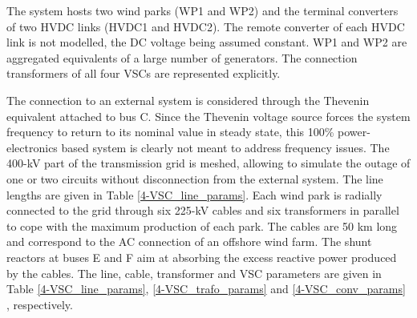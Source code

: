 \documentclass{report}
\begin{document}
The system hosts two wind parks (WP1 and WP2) and the terminal converters of two HVDC links (HVDC1 and HVDC2). The remote converter of each HVDC link is not modelled, the DC voltage being assumed constant. WP1 and WP2 are aggregated equivalents of a large number of generators. The connection transformers of all four VSCs are represented explicitly.

The connection to an external system is considered through the Thevenin equivalent attached to bus C. Since the Thevenin voltage source forces the system frequency to return to its nominal value in steady state, this 100\% power-electronics based system is clearly not meant to address frequency issues.
The 400-kV part of the transmission grid is meshed, allowing to simulate the outage of one or two circuits without disconnection from the external system. The line lengths are given in Table \ref{4-VSC_line_params}. Each wind park is radially connected to the grid through six 225-kV cables and six transformers in parallel to cope with the maximum production of each park. The cables are 50 km long and correspond to the AC connection of an offshore wind farm. The shunt reactors at buses E and F aim at absorbing the excess reactive power produced by the cables. The line, cable, transformer and VSC parameters are given in Table \ref{4-VSC_line_params}, \ref{4-VSC_trafo_params} and \ref{4-VSC_conv_params} , respectively.
\end{document}
